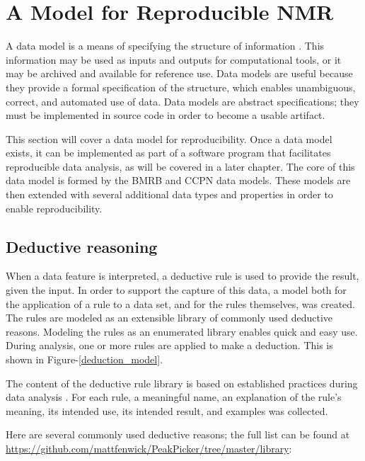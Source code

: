 \section{A Model for Reproducible NMR}

A data model is a means of specifying the structure of information  
\cite{codd1970relational}.  This
information may be used as inputs and outputs for computational tools, or
it may be archived and available for reference use.  Data models are useful
because they provide a formal specification of the structure, which enables
unambiguous, correct, and automated use of data.  Data models are
abstract specifications; they must be implemented in source code in order
to become a usable artifact.

This section will cover a data model for reproducibility.  Once a data
model exists, it can be implemented as part of a software program that
facilitates reproducible data analysis, as will be covered in a later 
chapter.  The core of this data model is formed by the BMRB \cite{bmrb}
and CCPN \cite{ccpn} data models.  These models are then extended with
several additional data types and properties in order to enable 
reproducibility.


\subsection{Deductive reasoning}
When a data feature is interpreted, a deductive rule is used to provide
the result, given the input.  In order to support the capture of this data, 
a model both for the application of a rule to a data set, and for the rules
themselves, was created.  The rules are modeled as an extensible library of 
commonly used deductive reasons.  Modeling the rules as an enumerated library 
enables quick and easy use.  During analysis, one or more rules are applied to 
make a deduction.  This is shown in Figure-\ref{deduction_model}.

The content of the deductive rule library is based on 
established practices during data analysis \cite{guerry2011automated, hncacb,
hnco, cbcaconh, hbhaconh, picky, xeasy, sparky, ccpn}.  For each rule, 
a meaningful name, an explanation of the rule's meaning, its intended use,
its intended result, and examples was collected.


Here are several commonly used deductive reasons; the full list can be found
at \url{https://github.com/mattfenwick/PeakPicker/tree/master/library}:

